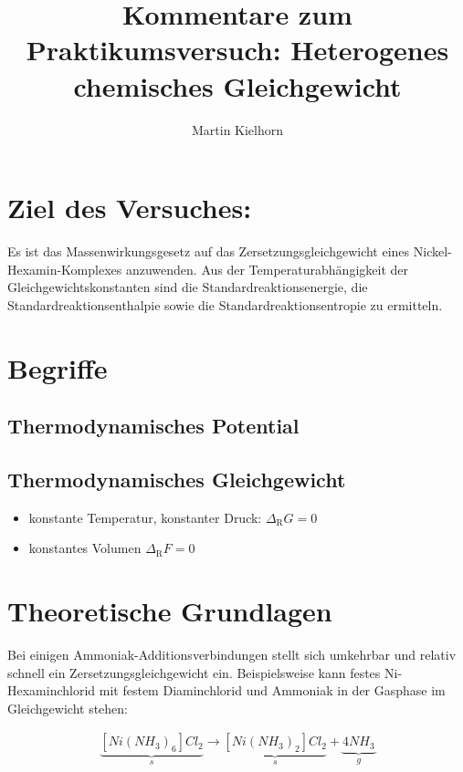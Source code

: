 \documentclass[english,twocolumn,DIV21,a4,10pt]{scrartcl}
\newcommand{\dr}{\Delta_\textrm{R}}
\begin{document}
\title{Kommentare zum Praktikumsversuch: Heterogenes chemisches Gleichgewicht}
\author{Martin Kielhorn}
\maketitle
\section{Ziel des Versuches:}
Es ist das Massenwirkungsgesetz auf das Zersetzungsgleichgewicht eines
Nickel-Hexamin-Komplexes anzuwenden. Aus der Temperaturabhängigkeit
der Gleichgewichtskonstanten sind die Standardreaktionsenergie, die
Standardreaktionsenthalpie sowie die Standardreaktionsentropie zu
ermitteln.
\section{Begriffe}
\printnomenclature
\subsection{Thermodynamisches Potential}
\subsection{Thermodynamisches Gleichgewicht}
\begin{itemize}
\item konstante Temperatur, konstanter Druck: $\dr G = 0$
\item konstantes Volumen $\dr F = 0$
\end{itemize}
\section{Theoretische Grundlagen}
Bei einigen Ammoniak-Additionsverbindungen stellt sich umkehrbar und
relativ schnell ein Zersetzungsgleichgewicht ein. Beispielsweise kann
festes Ni-Hexaminchlorid mit festem Diaminchlorid und Ammoniak in
der Gasphase im Gleichgewicht stehen:

\begin{align}
  \label{eqn:hex}
  \underbrace{[Ni(NH_3)_6]Cl_2}_s \rightarrow 
  \underbrace{[Ni(NH_3)_2]Cl_2}_s + \underbrace{4 NH_3}_g
\end{align}
\end{document}
